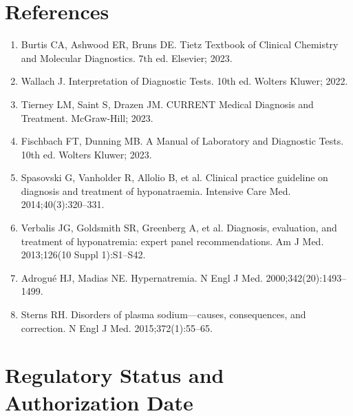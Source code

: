 \section*{References}
\begin{enumerate}
  \item Burtis CA, Ashwood ER, Bruns DE. Tietz Textbook of Clinical Chemistry and Molecular Diagnostics. 7th ed. Elsevier; 2023.
  \item Wallach J. Interpretation of Diagnostic Tests. 10th ed. Wolters Kluwer; 2022.
  \item Tierney LM, Saint S, Drazen JM. CURRENT Medical Diagnosis and Treatment. McGraw-Hill; 2023.
  \item Fischbach FT, Dunning MB. A Manual of Laboratory and Diagnostic Tests. 10th ed. Wolters Kluwer; 2023.
  \item Spasovski G, Vanholder R, Allolio B, et al. Clinical practice guideline on diagnosis and treatment of hyponatraemia. Intensive Care Med. 2014;40(3):320--331.
  \item Verbalis JG, Goldsmith SR, Greenberg A, et al. Diagnosis, evaluation, and treatment of hyponatremia: expert panel recommendations. Am J Med. 2013;126(10 Suppl 1):S1--S42.
  \item Adrogu\'{e} HJ, Madias NE. Hypernatremia. N Engl J Med. 2000;342(20):1493--1499.
  \item Sterns RH. Disorders of plasma sodium---causes, consequences, and correction. N Engl J Med. 2015;372(1):55--65.
\end{enumerate}

\clearpage
\section*{Regulatory Status and Authorization Date}

\clearpage
